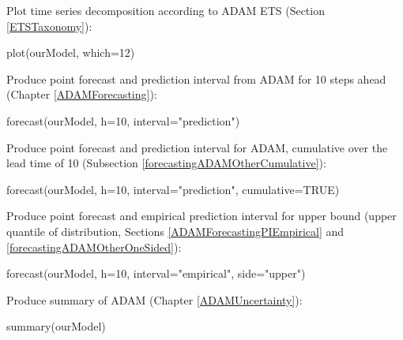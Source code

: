 \documentclass[
]{book}
\newenvironment{Shaded}{\begin{snugshade}}{\end{snugshade}}
\newcommand{\AttributeTok}[1]{\textcolor[rgb]{0.77,0.63,0.00}{#1}}
\newcommand{\ConstantTok}[1]{\textcolor[rgb]{0.00,0.00,0.00}{#1}}
\newcommand{\DecValTok}[1]{\textcolor[rgb]{0.00,0.00,0.81}{#1}}
\newcommand{\FunctionTok}[1]{\textcolor[rgb]{0.00,0.00,0.00}{#1}}
\newcommand{\NormalTok}[1]{#1}
\newcommand{\StringTok}[1]{\textcolor[rgb]{0.31,0.60,0.02}{#1}}
\theoremstyle{definition}
\theoremstyle{definition}
\theoremstyle{definition}
\theoremstyle{definition}
\theoremstyle{remark}
\begin{document}
Plot time series decomposition according to ADAM ETS (Section \ref{ETSTaxonomy}):

\begin{Shaded}
\begin{Highlighting}[]
\FunctionTok{plot}\NormalTok{(ourModel, }\AttributeTok{which=}\DecValTok{12}\NormalTok{)}
\end{Highlighting}
\end{Shaded}

Produce point forecast and prediction interval from ADAM for 10 steps ahead (Chapter \ref{ADAMForecasting}):

\begin{Shaded}
\begin{Highlighting}[]
\FunctionTok{forecast}\NormalTok{(ourModel, }\AttributeTok{h=}\DecValTok{10}\NormalTok{, }\AttributeTok{interval=}\StringTok{"prediction"}\NormalTok{)}
\end{Highlighting}
\end{Shaded}

Produce point forecast and prediction interval for ADAM, cumulative over the lead time of 10 (Subsection \ref{forecastingADAMOtherCumulative}):

\begin{Shaded}
\begin{Highlighting}[]
\FunctionTok{forecast}\NormalTok{(ourModel, }\AttributeTok{h=}\DecValTok{10}\NormalTok{, }\AttributeTok{interval=}\StringTok{"prediction"}\NormalTok{,}
         \AttributeTok{cumulative=}\ConstantTok{TRUE}\NormalTok{)}
\end{Highlighting}
\end{Shaded}

Produce point forecast and empirical prediction interval for upper bound (upper quantile of distribution, Sections \ref{ADAMForecastingPIEmpirical} and \ref{forecastingADAMOtherOneSided}):

\begin{Shaded}
\begin{Highlighting}[]
\FunctionTok{forecast}\NormalTok{(ourModel, }\AttributeTok{h=}\DecValTok{10}\NormalTok{, }\AttributeTok{interval=}\StringTok{"empirical"}\NormalTok{,}
         \AttributeTok{side=}\StringTok{"upper"}\NormalTok{)}
\end{Highlighting}
\end{Shaded}

Produce summary of ADAM (Chapter \ref{ADAMUncertainty}):

\begin{Shaded}
\begin{Highlighting}[]
\FunctionTok{summary}\NormalTok{(ourModel)}
\end{Highlighting}
\end{Shaded}
\end{document}

